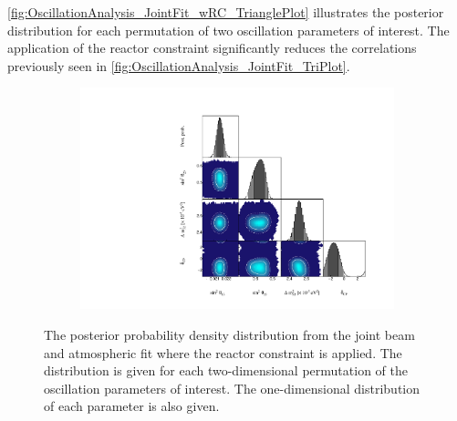\autoref{fig:OscillationAnalysis_JointFit_wRC_TrianglePlot} illustrates the posterior distribution for each permutation of two oscillation parameters of interest. The application of the reactor constraint significantly reduces the correlations previously seen in \autoref{fig:OscillationAnalysis_JointFit_TriPlot}.

\begin{figure}[h]
  \begin{subfigure}[t]{0.98\textwidth}
    \includegraphics[width=\textwidth, trim={0mm 0mm 0mm 0mm}, clip,page=1]{Figures/OA/JointFit_wRC/Contours_1D_wRC_UnSmeared_CredibleInterval_TrianglePlot.pdf}
  \end{subfigure}
  \caption{The posterior probability density distribution from the joint beam and atmospheric fit where the reactor constraint is applied. The distribution is given for each two-dimensional permutation of the oscillation parameters of interest. The one-dimensional distribution of each parameter is also given.}
  \label{fig:OscillationAnalysis_JointFit_wRC_TrianglePlot}
\end{figure}

